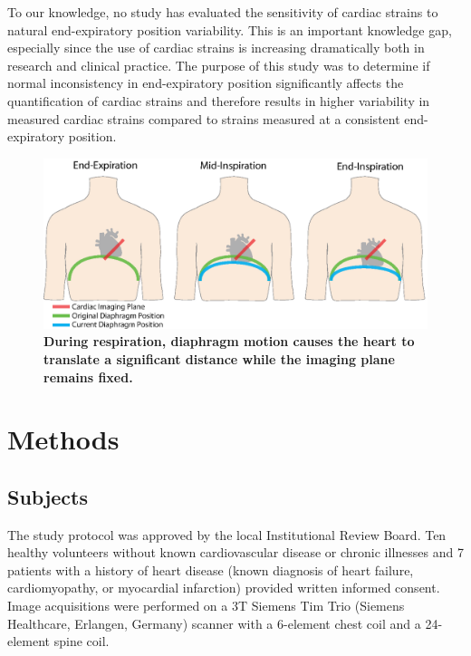 	To our knowledge, no study has evaluated the sensitivity of cardiac strains to natural end-expiratory position variability. This is an important knowledge gap, especially since the use of cardiac strains is increasing dramatically both in research and clinical practice. The purpose of this study was to determine if normal inconsistency in end-expiratory position significantly affects the quantification of cardiac strains and therefore results in higher variability in measured cardiac strains compared to strains measured at a consistent end-expiratory position.
	
	\begin{figure} 
		\includegraphics{figures/strainpaper/Fig1-range_of_diaphragm_position_breathing}
		\caption[During respiration, diaphragm motion causes the heart to translate a significant distance while the imaging plane remains fixed]{\textbf{During respiration, diaphragm motion causes the heart to translate a significant distance while the imaging plane remains fixed.}}
		\label{fig:diaphragmTranslation}
	\end{figure}

\section{Methods}

\subsection{Subjects}
	The study protocol was approved by the local Institutional Review Board. Ten healthy volunteers without known cardiovascular disease or chronic illnesses and 7 patients with a history of heart disease (known diagnosis of heart failure, cardiomyopathy, or myocardial infarction) provided written informed consent. Image acquisitions were performed on a 3T Siemens Tim Trio (Siemens Healthcare, Erlangen, Germany) scanner with a 6-element chest coil and a 24-element spine coil.

